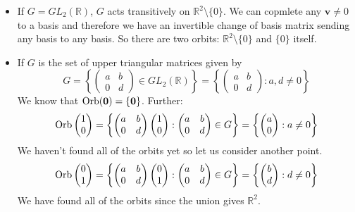 \documentclass{article}
\begin{document}
	\begin{itemize}
		\item If $G = GL_2(\mathbb R)$, $G$ acts transitively on $\mathbb R^2 \setminus \{ 0 \}$. We can copmlete any $\bm v \neq 0$ to a basis and therefore we have an invertible change of basis matrix sending any basis to any basis. So there are two orbits: $\mathbb R^2 \setminus \{ 0 \}$ and $\{ 0 \}$ itself.
		\item If $G$ is the set of upper triangular matrices given by
		\[ G = \left\{ \begin{pmatrix}
			a & b \\ 0 & d
		\end{pmatrix} \in GL_2(\mathbb R) \right\} = \left\{ \begin{pmatrix}
			a & b \\ 0 & d
		\end{pmatrix}: a, d \neq 0 \right\} \]
		We know that $\operatorname{Orb}(\bm 0) = \{ \bm 0 \}$. Further:
		\[ \operatorname{Orb}\begin{pmatrix}
			1 \\ 0
		\end{pmatrix} = \left\{ \begin{pmatrix}
			a & b \\ 0 & d
		\end{pmatrix} \begin{pmatrix}
			1 \\ 0
		\end{pmatrix}: \begin{pmatrix}
			a & b \\ 0 & d
		\end{pmatrix} \in G \right\} = \left\{ \begin{pmatrix}
			a \\ 0
		\end{pmatrix}: a \neq 0 \right\} \]
		We haven't found all of the orbits yet so let us consider another point.
		\[ \operatorname{Orb}\begin{pmatrix}
			0 \\ 1
		\end{pmatrix} = \left\{ \begin{pmatrix}
			a & b \\ 0 & d
		\end{pmatrix} \begin{pmatrix}
			0 \\ 1
		\end{pmatrix}: \begin{pmatrix}
			a & b \\ 0 & d
		\end{pmatrix} \in G \right\} = \left\{ \begin{pmatrix}
			b \\ d
		\end{pmatrix}: d \neq 0 \right\} \]
		We have found all of the orbits since the union gives $\mathbb R^2$.
	\end{itemize}
\end{document}
